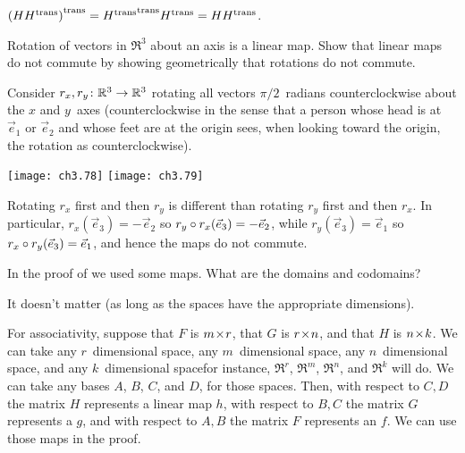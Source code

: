 \begin{exercises}
\begin{answer}
\begin{exparts}
          ${{(H{{H}^{\rm trans}})}^{\rm trans}}={{{{H}^{\rm trans}}}^{\rm trans}}{{H}^{\rm trans}}=H{{H}^{\rm trans}}$.
      \end{exparts}  
    \end{answer}
  \recommended \item
    Rotation of vectors in \( \Re^3 \) about an axis is a linear map.
    Show that linear maps do not commute by     
    showing geometrically that rotations do not commute.
    \begin{answer}
      Consider \( \mbox{$r_x,r_y\colon \mathbb{R}^3\to \mathbb{R}^3$} \) rotating all vectors
      \( \pi/2 \)~radians
      counterclockwise about the \( x \) and \( y \)~axes 
      (counterclockwise in the sense that a person whose head is at
      \( \vec{e}_1 \) or \( \vec{e}_2 \) and whose feet are at the origin
      sees, when looking toward the origin, the rotation as
      counterclockwise).
      \begin{center}  \small
        \texttt{[image: ch3.78]}
        \qquad
        \texttt{[image: ch3.79]}
      \end{center}
      Rotating $r_x$ first and then $r_y$ is different than
      rotating $r_y$ first and then $r_x$.
      In particular, $r_x(\vec{e}_3)=-\vec{e}_2$
      so $r_y\mathbin{\circ} r_x(\vec{e}_3)=-\vec{e}_2$,
      while $r_y(\vec{e}_3)=\vec{e}_1$ so
      $r_x\mathbin{\circ} r_y(\vec{e}_3)=\vec{e}_1$,
      and hence the maps do not commute.
    \end{answer}
  \item \label{exer:MatProdPropsSpAndBas}
    In the proof of  we used some maps.
    What are the domains and codomains?
    \begin{answer}
      It doesn't matter (as long as the spaces have the appropriate 
     dimensions).

      For associativity, 
      suppose that $F$ is $m \! \times \! r$, that $G$ is $r \! \times \! n$, and
      that $H$ is $n \! \times \! k$.
      We can take any $r$~dimensional space, 
      any $m$~dimensional space, any $n$~dimensional space, and any
      $k$~dimensional space\Dash for instance, 
      $\Re^r$, $\Re^m$, $\Re^n$, and $\Re^k$ will do.
      We can take any bases $A$, $B$, $C$, and $D$, for those spaces.
      Then, 
      with respect to $C,D$ the matrix $H$ represents a linear map $h$,
      with respect to $B,C$ the matrix $G$ represents a $g$,
      and with respect to $A,B$ the matrix $F$ represents an $f$.
      We can use those maps in the proof.
      

\end{answer}
\end{exercises}
